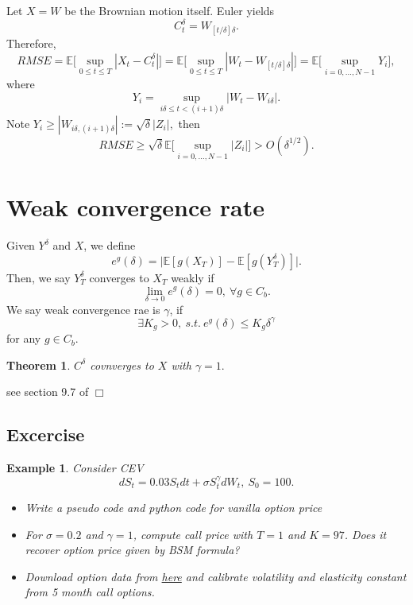 \documentclass{article}
\newtheorem{theorem}{Theorem}
\newtheorem{example}{Example}
\newenvironment{proof}{\noindent {\sc Proof:}}{$\Box$} %
\begin{document}
Let $X = W$ be the Brownian motion itself.
Euler yields
$$C_{t}^{\delta} = W_{[t/\delta] \delta}.$$
Therefore, 
$$RMSE = 
\mathbb E  \Big [\sup_{0 \le t\le T} |X_{t} - C_{t}^{\delta}| \Big] 
= \mathbb E  \Big [\sup_{0 \le t\le T} |W_{t} - W_{[t/\delta]\delta}| \Big] 
=  \mathbb E  \Big [\sup_{i = 0, \ldots, N-1} Y_{i} \Big],
$$
where 
$$Y_{i} = \sup_{i\delta \le t < (i+1) \delta} |W_{t} - W_{i\delta}|.$$
Note $Y_{i} \ge |W_{i\delta, (i+1)\delta}| := \sqrt \delta |Z_{i}|,$ then 
$$RMSE \ge  \sqrt \delta  \mathbb E  
\Big [\sup_{i = 0, \ldots, N-1} |Z_{i}| \Big ]
> O(\delta^{1/2}).$$

\section{Weak convergence rate}
Given $Y^{\delta}$ and $X$, we define
$$e^{g} (\delta) = \Big| \mathbb E[ g(X_{T})] - 
\mathbb E[g (Y^{\delta}_{T})] \Big|.$$
Then, we say $Y^{\delta}_{T} $ converges to $X_{T}$ weakly if
$$\lim_{\delta\to 0} e^{g} (\delta) = 0, \ \forall g \in C_{b}.$$
We say weak convergence rae is $\gamma$, if
$$\exists K_{g} >0, \ s.t. \ e^{g}(\delta) \le K_{g} \delta^{\gamma}$$
for any $g\in C_{b}$.

\begin{theorem}
 $C^{\delta}$ covnverges to $X$ with $\gamma = 1.$
\end{theorem}
\begin{proof}
 see section 9.7 of  \cite{KP92}
\end{proof}

\subsection{Excercise}

\begin{example}
 \label{ex:cevel}
 Consider CEV 
$$d S_{t} = 0.03 S_{t} dt + \sigma S_{t}^{\gamma} dW_{t}, \ S_{0} =100.$$
\begin{itemize}
\item  Write a pseudo code and python code for vanilla option price
\item For $\sigma = 0.2$ and $\gamma = 1$, compute call price with $T =1$ and $K = 97$. Does it recover option price given by BSM formula?
\item Download option data from  
\href{https://github.com/songqsh/20s_ma573/blob/master/src/20optiondata2.dat}{here}
and calibrate volatility and elasticity constant from 5 month call options.
 \end{itemize}
\end{example}



%
%

\end{document}
